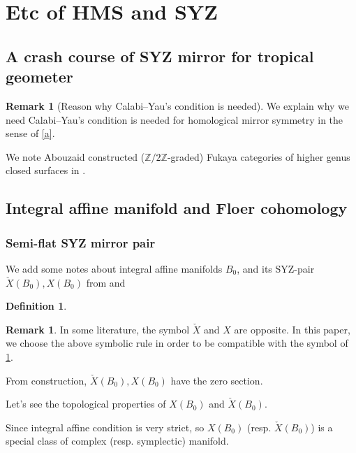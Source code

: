 \documentclass[a4paper,dvipdfmx,reqno,12pt]{amsart}
\theoremstyle{definition}
\newtheorem{definition}[theorem]{Definition}
\newtheorem{remark}[theorem]{Remark}
\newcommand{\Z}{\mathbb{Z}}%
\numberwithin{equation}{section}
\begin{document}
\section{Etc of HMS and SYZ}

\subsection{A crash course of SYZ mirror for tropical 
geometer}

\begin{remark}[{Reason why Calabi--Yau's condition is needed}]

We explain why we need Calabi--Yau's condition is needed for
homological mirror symmetry in the sense of \cref{a}.

We note Abouzaid constructed ($\Z/2\Z$-graded)
Fukaya categories of higher genus closed surfaces in
\cite{MR2383898}. 
\end{remark}





\subsection{Integral affine manifold and Floer cohomology}

\subsubsection{Semi-flat SYZ mirror pair}

We add some notes about integral affine manifolds $B_0$, and its SYZ-pair $\check{X}(B_0), X(B_0)$ from \cite[Chapter 6]{MR2567952} and \cite{MR2737696,MR3079343}

\begin{definition}
\label{definition-SYZ-torus-fibration}
\end{definition}

\begin{remark}
In some literature, the symbol $\check{X}$ and
$X$ are opposite. In this paper, we choose the above
symbolic rule in order to be compatible with the symbol of 
\cref{definition-SYZ-torus-fibration}.
\end{remark}

From construction, $\check{X}(B_0), X(B_0)$ have the zero section.

Let's see the topological properties of $X(B_0)$ and $\check{X}(B_0)$.

Since integral affine condition is very strict, so $X(B_0)$ (resp. $\check{X}(B_0)$) is a special class of complex (resp. symplectic) manifold.
\end{document}
